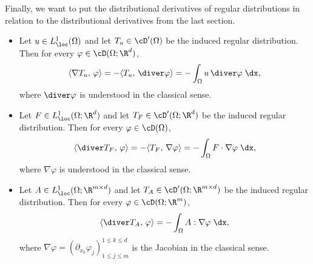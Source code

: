 Finally, we want to put the distributional derivatives of regular distributions in relation to the distributional derivatives from the last section.

\begin{proposition}\label{pr:ibp_regular_distributions}
	\quad
	\begin{itemize}
		\item[i)] Let $u\in L^1_\loc(\Omega)$ and let $T_u\in\cD'(\Omega)$ be the induced regular distribution. Then for every $\varphi\in\cD(\Omega;\R^d)$,
		      \begin{equation*}
			      \langle \nabla T_u,\,\varphi\rangle
			      =
			      -\langle T_u,\,\diver\varphi\rangle
			      =
			      -\int_\Omega u\,\diver\varphi\;\dx,
		      \end{equation*}
		      where $\diver\varphi$ is understood in the classical sense.

		\item[ii)] Let $F\in L^1_\loc(\Omega;\R^d)$ and let $T_F\in\cD'(\Omega;\R^d)$ be the induced regular distribution. Then for every $\varphi\in\cD(\Omega)$,
		      \begin{equation*}
			      \langle \diver T_F,\,\varphi\rangle
			      =
			      -\langle T_F,\,\nabla\varphi\rangle
			      =
			      -\int_\Omega F\cdot\nabla\varphi\;\dx,
		      \end{equation*}
		      where $\nabla\varphi$ is understood in the classical sense.

		\item[iii)] Let $A\in L^1_\loc(\Omega;\R^{m\times d})$ and let $T_A\in\cD'(\Omega;\R^{m\times d})$ be the induced regular distribution. Then for every $\varphi\in\cD(\Omega;\R^m)$,
		      \begin{equation*}
			      \langle \diver T_A,\,\varphi\rangle
			      =
			      -\int_\Omega A:\nabla\varphi\;\dx,
		      \end{equation*}
		      where $\nabla\varphi=(\partial_{x_k}\varphi_j)_{1\le j\le m}^{1\le k\le d}$ is the Jacobian in the classical sense.
	\end{itemize}
\end{proposition}

